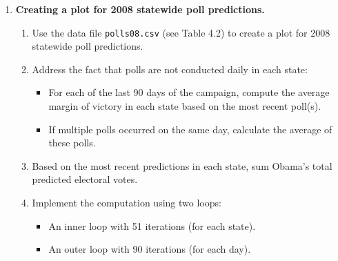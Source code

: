 \documentclass[12pt]{article}
\begin{document}
\begin{enumerate}
    \item \textbf{Creating a plot for 2008 statewide poll predictions.}
    \begin{enumerate}[label=(\alph*)]
        \item Use the data file \texttt{polls08.csv} (see Table 4.2) to create a plot for 2008 statewide poll predictions.
        \item Address the fact that polls are not conducted daily in each state:
        \begin{itemize}
            \item For each of the last 90 days of the campaign, compute the average margin of victory in each state based on the most recent poll(s).
            \item If multiple polls occurred on the same day, calculate the average of these polls.
        \end{itemize}
        \item Based on the most recent predictions in each state, sum Obama’s total predicted electoral votes.
        \item Implement the computation using two loops:
        \begin{itemize}
            \item An inner loop with 51 iterations (for each state).
            \item An outer loop with 90 iterations (for each day).
        \end{itemize}
    \end{enumerate}
    

\end{enumerate}
\end{document}

